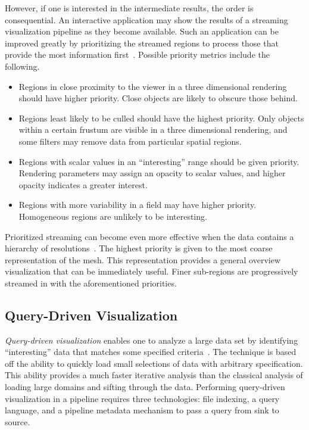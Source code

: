 \documentclass[journal,onecolumn,12pt,letterpaper,twoside]{IEEEtran}
\newcommand*{\lcite}[1]{~\cite{#1}}
\newcommand*{\keyterm}[1]{\emph{#1}}
\newenvironment{packeditemize}{
  \begin{itemize}
    \setlength{\topsep}{0pt}
    \setlength{\itemsep}{0pt}
    \setlength{\parskip}{0pt}
    \setlength{\parsep}{0pt}
    \setlength{\partopsep}{0pt}
}{
  \end{itemize}
}
\begin{document}
However, if one is interested in the intermediate results, the order is
consequential.  An interactive application may show the results of a
streaming visualization pipeline as they become available.  Such an
application can be improved greatly by prioritizing the streamed regions to
process those that provide the most information first\lcite{Ahrens2007}.
Possible priority metrics include the following.
\begin{packeditemize}
\item Regions in close proximity to the viewer in a three dimensional
  rendering should have higher priority.  Close objects are likely to
  obscure those behind.
\item Regions least likely to be culled should have the highest priority.
  Only objects within a certain frustum are visible in a three dimensional
  rendering, and some filters may remove data from particular spatial
  regions.
\item Regions with scalar values in an ``interesting'' range should be
  given priority.  Rendering parameters may assign an opacity to scalar
  values, and higher opacity indicates a greater interest.
\item Regions with more variability in a field may have higher priority.
  Homogeneous regions are unlikely to be interesting.
\end{packeditemize}

Prioritized streaming can become even more effective when the data contains
a hierarchy of resolutions\lcite{Ahrens2009}.  The highest priority is
given to the most coarse representation of the mesh.  This representation
provides a general overview visualization that can be immediately useful.
Finer sub-regions are progressively streamed in with the aforementioned
priorities.

\subsection{Query-Driven Visualization}
\label{sec:QueryDrivenVisualization}

\keyterm{Query-driven visualization} enables one to analyze a large data
set by identifying ``interesting'' data that matches some specified
criteria\lcite{Stockinger2005,Gosink2008}.  The technique is based off the
ability to quickly load small selections of data with arbitrary
specification.  This ability provides a much faster iterative analysis than
the classical analysis of loading large domains and sifting through the
data.  Performing query-driven visualization in a pipeline requires three
technologies: file indexing, a query language, and a pipeline metadata
mechanism to pass a query from sink to source.
\end{document}
